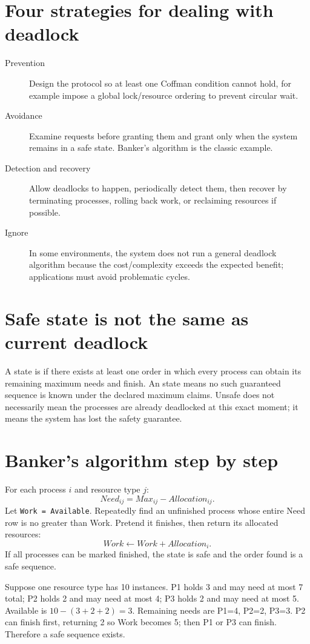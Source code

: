 \section{Four strategies for dealing with deadlock}
\begin{description}
  \item[Prevention] Design the protocol so at least one Coffman condition cannot hold, for example impose a global lock/resource ordering to prevent circular wait.
  \item[Avoidance] Examine requests before granting them and grant only when the system remains in a safe state. Banker's algorithm is the classic example.
  \item[Detection and recovery] Allow deadlocks to happen, periodically detect them, then recover by terminating processes, rolling back work, or reclaiming resources if possible.
  \item[Ignore] In some environments, the system does not run a general deadlock algorithm because the cost/complexity exceeds the expected benefit; applications must avoid problematic cycles.
\end{description}

\section{Safe state is not the same as current deadlock}
A state is  if there exists at least one order in which every process can obtain its remaining maximum needs and finish. An  state means no such guaranteed sequence is known under the declared maximum claims. Unsafe does not necessarily mean the processes are already deadlocked at this exact moment; it means the system has lost the safety guarantee.

\section{Banker's algorithm step by step}
For each process $i$ and resource type $j$:
\[
Need_{ij}=Max_{ij}-Allocation_{ij}.
\]
Let \texttt{Work = Available}. Repeatedly find an unfinished process whose entire Need row is no greater than Work. Pretend it finishes, then return its allocated resources:
\[
Work \leftarrow Work + Allocation_i.
\]
If all processes can be marked finished, the state is safe and the order found is a safe sequence.

\begin{workedexample}
Suppose one resource type has 10 instances. P1 holds 3 and may need at most 7 total; P2 holds 2 and may need at most 4; P3 holds 2 and may need at most 5. Available is $10-(3+2+2)=3$. Remaining needs are P1=4, P2=2, P3=3. P2 can finish first, returning 2 so Work becomes 5; then P1 or P3 can finish. Therefore a safe sequence exists.
\end{workedexample}


